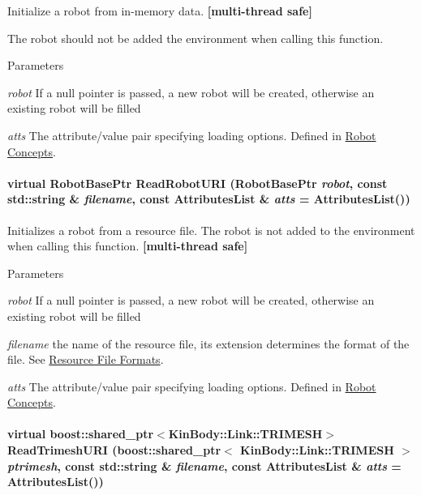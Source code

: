 Initialize a robot from in-\/memory data. {\bfseries \mbox{[}multi-\/thread safe\mbox{]}} 

The robot should not be added the environment when calling this function. 
\begin{DoxyParams}{Parameters}
\item[{\em robot}]If a null pointer is passed, a new robot will be created, otherwise an existing robot will be filled \item[{\em atts}]The attribute/value pair specifying loading options. Defined in \hyperlink{arch__robot}{Robot Concepts}. \end{DoxyParams}
\hypertarget{classOpenRAVE_1_1EnvironmentBase_ac8438f3ee051493a82ef78b92e9309f0}{
\paragraph[{ReadRobotURI}]{\setlength{\rightskip}{0pt plus 5cm}virtual RobotBasePtr ReadRobotURI (RobotBasePtr {\em robot}, \/  const std::string \& {\em filename}, \/  const AttributesList \& {\em atts} = {\ttfamily AttributesList()})}\hfill}
\label{classOpenRAVE_1_1EnvironmentBase_ac8438f3ee051493a82ef78b92e9309f0}


Initializes a robot from a resource file. The robot is not added to the environment when calling this function. {\bfseries \mbox{[}multi-\/thread safe\mbox{]}} 


\begin{DoxyParams}{Parameters}
\item[{\em robot}]If a null pointer is passed, a new robot will be created, otherwise an existing robot will be filled \item[{\em filename}]the name of the resource file, its extension determines the format of the file. See \hyperlink{architecture__concepts_supported_formats}{Resource File Formats}. \item[{\em atts}]The attribute/value pair specifying loading options. Defined in \hyperlink{arch__robot}{Robot Concepts}. \end{DoxyParams}
\hypertarget{classOpenRAVE_1_1EnvironmentBase_ac12a12b9515823e2371cd4c04b201a6c}{
\paragraph[{ReadTrimeshURI}]{\setlength{\rightskip}{0pt plus 5cm}virtual boost::shared\_\-ptr$<${\bf KinBody::Link::TRIMESH}$>$ ReadTrimeshURI (boost::shared\_\-ptr$<$ {\bf KinBody::Link::TRIMESH} $>$ {\em ptrimesh}, \/  const std::string \& {\em filename}, \/  const AttributesList \& {\em atts} = {\ttfamily AttributesList()})}\hfill}
\label{classOpenRAVE_1_1EnvironmentBase_ac12a12b9515823e2371cd4c04b201a6c}


